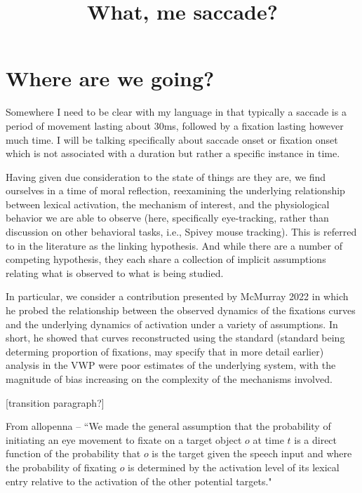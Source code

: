 \documentclass{article}
\title{What, me saccade?}
\date{}
\begin{document}

\maketitle

%


\section{Where are we going?} 

Somewhere I need to be clear with my language in that typically a saccade is a period of movement lasting about 30ms, followed by a fixation lasting however much time. I will be talking specifically about saccade onset or fixation onset which is not associated with a duration but rather a specific instance in time.

Having given due consideration to the state of things are they are, we find ourselves in a time of moral reflection, reexamining the underlying relationship between lexical activation, the mechanism of interest, and the physiological behavior we are able to observe (here, specifically eye-tracking, rather than discussion on other behavioral tasks, i.e., Spivey mouse tracking). This is referred to in the literature as the linking hypothesis. And while there are a number of competing hypothesis, they each share a collection of implicit assumptions relating what is observed to what is being studied.

In particular, we consider a contribution presented by McMurray 2022 in which he probed the relationship between the observed dynamics of the fixations curves and the underlying dynamics of activation under a variety of assumptions. In short, he showed that curves reconstructed using the standard  (standard being determing proportion of fixations, may specify that in more detail earlier) analysis in the VWP were poor estimates of the underlying system, with the magnitude of bias increasing on the complexity of the mechanisms involved.

[transition paragraph?]

From allopenna -- ``We made the general assumption that the probability of initiating an eye movement to fixate on a target object $o$ at time $t$ is a direct function of the probability that $o$ is the target given the speech input and where the probability of fixating $o$ is determined by the activation level of its lexical entry relative to the activation of the other potential targets."
\end{document}
